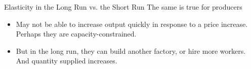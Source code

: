 \documentclass[12pt,t]{beamer}
\begin{document}
\begin{frame}{Elasticity in the Long Run vs. the Short Run}
  The same is true for producers
  
  \begin{itemize}
    \item May not be able to increase output quickly in response to a price increase. Perhaps they are capacity-constrained.

    \item But in the long run, they can build another factory, or hire more workers. And quantity supplied increases.
  \end{itemize}
\end{frame}
\end{document}
